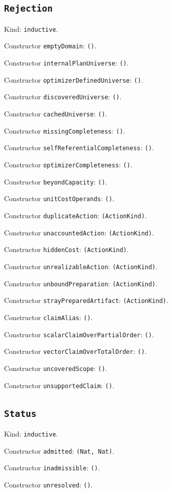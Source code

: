 \documentclass[11pt]{article}
\begin{document}
\subsection*{\texttt{Rejection}}
\noindent Kind: \texttt{inductive}.\par
\noindent Constructor \texttt{emptyDomain}: \texttt{()}.\par
\noindent Constructor \texttt{internalPlanUniverse}: \texttt{()}.\par
\noindent Constructor \texttt{optimizerDefinedUniverse}: \texttt{()}.\par
\noindent Constructor \texttt{discoveredUniverse}: \texttt{()}.\par
\noindent Constructor \texttt{cachedUniverse}: \texttt{()}.\par
\noindent Constructor \texttt{missingCompleteness}: \texttt{()}.\par
\noindent Constructor \texttt{selfReferentialCompleteness}: \texttt{()}.\par
\noindent Constructor \texttt{optimizerCompleteness}: \texttt{()}.\par
\noindent Constructor \texttt{beyondCapacity}: \texttt{()}.\par
\noindent Constructor \texttt{unitCostOperands}: \texttt{()}.\par
\noindent Constructor \texttt{duplicateAction}: \texttt{(ActionKind)}.\par
\noindent Constructor \texttt{unaccountedAction}: \texttt{(ActionKind)}.\par
\noindent Constructor \texttt{hiddenCost}: \texttt{(ActionKind)}.\par
\noindent Constructor \texttt{unrealizableAction}: \texttt{(ActionKind)}.\par
\noindent Constructor \texttt{unboundPreparation}: \texttt{(ActionKind)}.\par
\noindent Constructor \texttt{strayPreparedArtifact}: \texttt{(ActionKind)}.\par
\noindent Constructor \texttt{claimAlias}: \texttt{()}.\par
\noindent Constructor \texttt{scalarClaimOverPartialOrder}: \texttt{()}.\par
\noindent Constructor \texttt{vectorClaimOverTotalOrder}: \texttt{()}.\par
\noindent Constructor \texttt{uncoveredScope}: \texttt{()}.\par
\noindent Constructor \texttt{unsupportedClaim}: \texttt{()}.\par
\subsection*{\texttt{Status}}
\noindent Kind: \texttt{inductive}.\par
\noindent Constructor \texttt{admitted}: \texttt{(Nat, Nat)}.\par
\noindent Constructor \texttt{inadmissible}: \texttt{()}.\par
\noindent Constructor \texttt{unresolved}: \texttt{()}.\par
\end{document}
